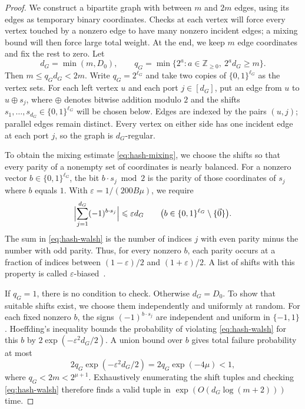 \documentclass[11pt,reqno]{amsart}
\numberwithin{equation}{section}
\theoremstyle{definition}\newtheorem{definition}[theorem]{Definition}
\theoremstyle{remark}\newtheorem{remark}[theorem]{Remark}
\renewcommand{\le}{\leqslant}
\renewcommand{\ge}{\geqslant}
\begin{document}
\begin{proof}
We construct a bipartite graph with between $m$ and $2m$ edges,
using its edges as temporary binary coordinates. Checks at each vertex
will force every vertex touched by a nonzero edge to have many nonzero
incident edges; a mixing bound will then force large total weight.
At the end, we keep $m$ edge coordinates and fix the rest to zero.
Let
\[
 d_G=\min(m,D_0),
 \qquad
 q_G=\min\{2^a:a\in\mathbb Z_{\ge0},\ 2^a d_G\ge m\}.
\]
Then $m\le q_Gd_G<2m$. Write $q_G=2^{\ell_G}$ and take two copies
of $\{0,1\}^{\ell_G}$ as the vertex sets. For each left vertex $u$
and each port $j\in[d_G]$, put an edge from $u$ to $u\oplus s_j$,
where $\oplus$ denotes bitwise addition modulo $2$ and the shifts
$s_1,\ldots,s_{d_G}\in\{0,1\}^{\ell_G}$ will be chosen below.
Edges are indexed by the pairs $(u,j)$; parallel edges remain
distinct. Every vertex on either side has one incident edge at
each port $j$, so the graph is $d_G$-regular.

To obtain the mixing estimate \eqref{eq:hash-mixing}, we choose
the shifts so that every parity of a nonempty set of coordinates
is nearly balanced. For a nonzero vector
$b\in\{0,1\}^{\ell_G}$, the bit $b\cdot s_j\bmod2$ is the parity
of those coordinates of $s_j$ where $b$ equals $1$.
With $\varepsilon=1/(200B\mu)$, we require
\begin{equation}\label{eq:hash-walsh}
 \Bigl|\sum_{j=1}^{d_G}(-1)^{b\cdot s_j}\Bigr|
 \le\varepsilon d_G
 \qquad
 \bigl(b\in\{0,1\}^{\ell_G}\setminus\{\vec{0}\}\bigr).
\end{equation}
The sum in \eqref{eq:hash-walsh} is the number of indices $j$
with even parity minus the number with odd parity. Thus, for
every nonzero $b$, each parity occurs at a fraction of indices
between $(1-\varepsilon)/2$ and $(1+\varepsilon)/2$.
A list of shifts with this property is called
$\varepsilon$-biased~\cite[Definitions~2.1--2.2]{NN93}.

If $q_G=1$, there is no condition to check. Otherwise $d_G=D_0$.
To show that suitable shifts exist, we choose them independently
and uniformly at random. For each fixed nonzero $b$, the signs
$(-1)^{b\cdot s_j}$ are independent and uniform in $\{-1,1\}$.
Hoeffding's inequality bounds the probability of violating
\eqref{eq:hash-walsh} for this $b$ by
$2\exp(-\varepsilon^2d_G/2)$. A union bound over $b$ gives total
failure probability at most
\[
 2q_G\exp(-\varepsilon^2d_G/2)
 =2q_G\exp(-4\mu)<1,
\]
where $q_G<2m<2^{\mu+1}$. Exhaustively enumerating the shift tuples
and checking \eqref{eq:hash-walsh} therefore finds a valid tuple in
$\exp(O(d_G\log(m+2)))$ time.


\end{proof}
\end{document}
